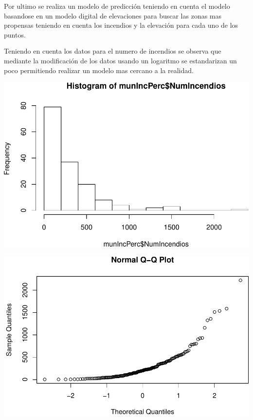 \documentclass[11pt,]{article}
\newenvironment{Shaded}{\begin{snugshade}}{\end{snugshade}}
\newcommand{\KeywordTok}[1]{\textcolor[rgb]{0.13,0.29,0.53}{\textbf{#1}}}
\newcommand{\OperatorTok}[1]{\textcolor[rgb]{0.81,0.36,0.00}{\textbf{#1}}}
\newcommand{\NormalTok}[1]{#1}
\begin{document}
Por ultimo se realiza un modelo de predicción teniendo en cuenta el
modelo basandose en un modelo digital de elevaciones para buscar las
zonas mas propensas teniendo en cuenta los incendios y la elevación para
cada uno de los puntos.

Teniendo en cuenta los datos para el numero de incendios se observa que
mediante la modificación de los datos usando un logaritmo se
estandarizan un poco permitiendo realizar un modelo mas cercano a la
realidad.

\begin{Shaded}
\end{Shaded}

\includegraphics{proyecto_files/figure-latex/unnamed-chunk-49-1.pdf}

\begin{Shaded}
\end{Shaded}

\includegraphics{proyecto_files/figure-latex/unnamed-chunk-49-2.pdf}
\end{document}
